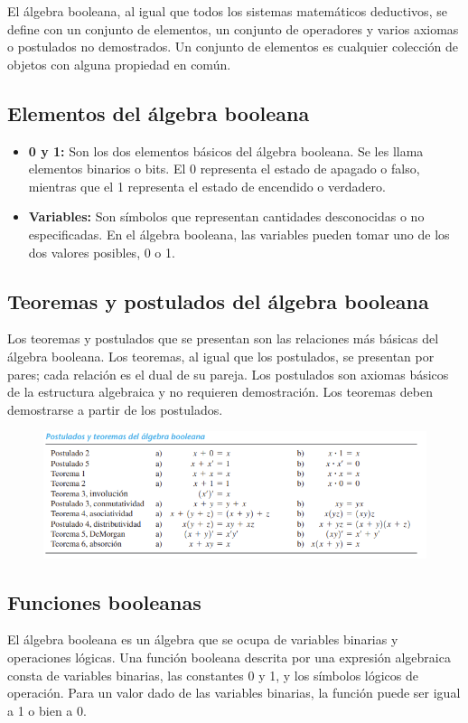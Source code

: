 El álgebra booleana, al igual que todos los sistemas matemáticos deductivos, se define con
un conjunto de elementos, un conjunto de operadores y varios axiomas o postulados no
demostrados. Un conjunto de elementos es cualquier colección de objetos con alguna propiedad
en común.

\subsection{Elementos del álgebra booleana}
\begin{itemize}
    \item \textbf{0 y 1:} Son los dos elementos básicos del álgebra booleana. Se les llama
    elementos binarios o bits. El 0 representa el estado de apagado o falso, mientras que el 1
    representa el estado de encendido o verdadero.
    \item \textbf{Variables:} Son símbolos que representan cantidades desconocidas o no
    especificadas. En el álgebra booleana, las variables pueden tomar uno de los dos valores
    posibles, 0 o 1.
\end{itemize}

\subsection{Teoremas y postulados del álgebra booleana}
Los teoremas y postulados que se presentan son las relaciones más básicas del álgebra
booleana. Los teoremas, al igual que los postulados, se presentan por pares; cada relación es
el dual de su pareja. Los postulados son axiomas básicos de la estructura algebraica y no requieren demostración. Los teoremas deben demostrarse a partir de los postulados.

\begin{figure}[h]
\centering
\includegraphics[scale=1]{img/teopol.png}
\end{figure}

\subsection{Funciones booleanas}
El álgebra booleana es un álgebra que se ocupa de variables binarias y operaciones lógicas. Una función booleana descrita por una expresión algebraica consta de variables binarias, las constantes 0 y 1, y los símbolos lógicos de operación. Para un valor dado de las variables binarias, la función puede ser igual a 1 o bien a 0.

